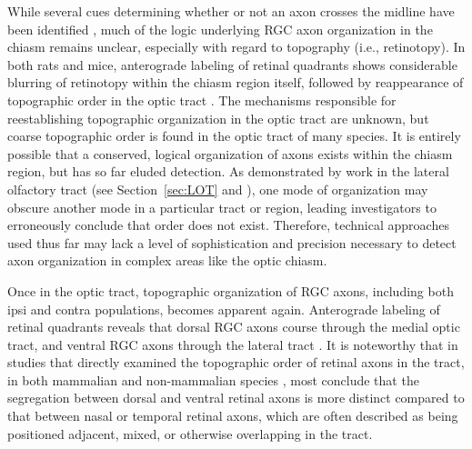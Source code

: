 While several cues determining whether or not an axon crosses the midline have been identified \cite{erskine2014connecting}, much of the logic underlying RGC axon organization in the chiasm remains unclear, especially with regard to topography (i.e., retinotopy).
In both rats and mice, anterograde labeling of retinal quadrants shows considerable blurring of retinotopy within the chiasm region itself, followed by reappearance of topographic order in the optic tract \cite{chan1994changes,chan1999changes}.
The mechanisms responsible for reestablishing topographic organization in the optic tract are unknown, but coarse topographic order is found in the optic tract of many species.
It is entirely possible that a conserved, logical organization of axons exists within the chiasm region, but has so far eluded detection.
As demonstrated by work in the lateral olfactory tract (see Section~\ref{sec:LOT} and ), one mode of organization may obscure another mode in a particular tract or region, leading investigators to erroneously conclude that order does not exist.
Therefore, technical approaches used thus far may lack a level of sophistication and precision necessary to detect axon organization in complex areas like the optic chiasm.

Once in the optic tract, topographic organization of RGC axons, including both ipsi and contra populations, becomes apparent again.
Anterograde labeling of retinal quadrants reveals that dorsal RGC axons course through the medial optic tract, and ventral RGC axons through the lateral tract \cite{torrealba1982studies,reh1983organization,reese1990fibre,reese1993reestablishment,chan1994changes,chan1999changes,plas2005pretarget}.
It is noteworthy that in studies that directly examined the topographic order of retinal axons in the tract, in both mammalian \cite{reese1993reestablishment,chan1994changes,plas2005pretarget} and non-mammalian species \cite{reh1983organization,thanos1983investigations,ehrlich1984course,montgomery1998organization}, most conclude that the segregation between dorsal and ventral retinal axons is more distinct compared to that between nasal or temporal retinal axons, which are often described as being positioned adjacent, mixed, or otherwise overlapping in the tract.

